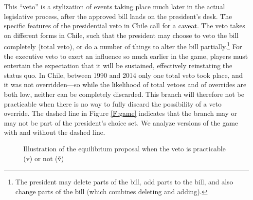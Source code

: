 \documentclass[letter,12pt]{article}
\begin{document}
This ``veto'' is a stylization of events taking place much later in the actual legislative process, after the approved bill lands on the president's desk. The specific features of the presidential veto in Chile call for a caveat. The veto takes on different forms in Chile, such that the president may choose to veto the bill completely (total veto), or do a number of things to alter the bill partially.\footnote{The president may delete parts of the bill, add parts to the bill, and also change parts of the bill (which combines deleting and adding).} For the executive veto to exert an influence so much earlier in the game, players must entertain the expectation that it will be sustained, effectively reinstating the status quo. In Chile, between 1990 and 2014 only one total veto took place, and it was not overridden---so while the likelihood of total vetoes and of overrides are both low, neither can be completely discarded. This branch will therefore not be practicable when there is no way to fully discard the possibility of a veto override. The dashed line in Figure \ref{F:game} indicates that the branch may or may not be part of the president's choice set. We analyze versions of the game with and without the dashed line. 

\begin{figure}
  \centering
  \caption{Illustration of the equilibrium proposal when the veto is practicable (v) or not (\~v)}\label{F:example}
\end{figure}
\end{document}
